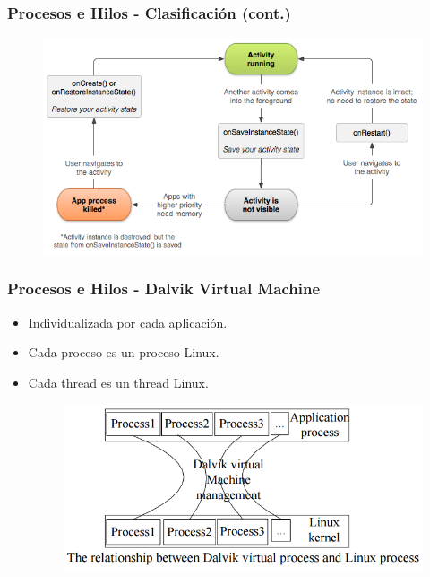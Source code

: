 \begin{frame}
  \frametitle{Procesos e Hilos - Clasificación (cont.)}
  \begin{figure}
      \centering
      \includegraphics[scale=0.5]{images/restore-instance.png}
  \end{figure}
\end{frame}

\begin{frame}
  \frametitle{Procesos e Hilos - Dalvik Virtual Machine}
  \begin{itemize}
      \item Individualizada por cada aplicación.
      
      \item Cada proceso es un proceso Linux.
      
      \item Cada thread es un thread Linux.
      
      \begin{figure}
	\centering
	\includegraphics[scale=0.3]{images/dvm-linux-processes.png}
      \end{figure}
  \end{itemize}
\end{frame}

